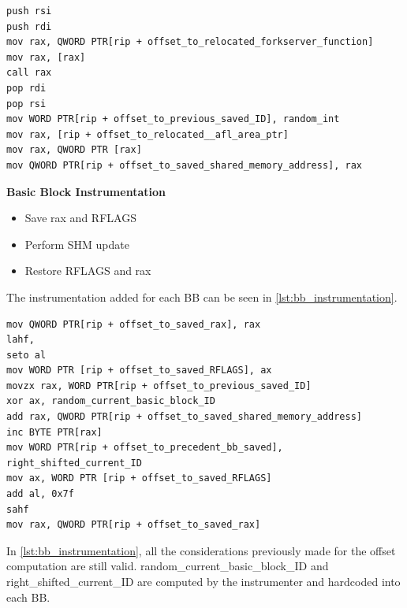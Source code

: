 \begin{lstlisting}[caption={Initial Instrumentation},label=lst:init_instr]
push rsi
push rdi
mov rax, QWORD PTR[rip + offset_to_relocated_forkserver_function]
mov rax, [rax]
call rax
pop rdi
pop rsi
mov WORD PTR[rip + offset_to_previous_saved_ID], random_int
mov rax, [rip + offset_to_relocated__afl_area_ptr]
mov rax, QWORD PTR [rax]
mov QWORD PTR[rip + offset_to_saved_shared_memory_address], rax
\end{lstlisting}

\begin{center}
\textbf{Basic Block Instrumentation}    
\end{center}
\begin{itemize}
    \item Save rax and RFLAGS
    \item Perform \gls{SHM} update 
    \item Restore RFLAGS and rax
\end{itemize}
The instrumentation added for each \gls{BB} can be seen in \cref{lst:bb_instrumentation}.

\begin{lstlisting}[caption={Basic Block Instrumentation},label=lst:bb_instrumentation]
mov QWORD PTR[rip + offset_to_saved_rax], rax
lahf,
seto al
mov WORD PTR [rip + offset_to_saved_RFLAGS], ax
movzx rax, WORD PTR[rip + offset_to_previous_saved_ID]        
xor ax, random_current_basic_block_ID
add rax, QWORD PTR[rip + offset_to_saved_shared_memory_address]
inc BYTE PTR[rax]
mov WORD PTR[rip + offset_to_precedent_bb_saved], right_shifted_current_ID
mov ax, WORD PTR [rip + offset_to_saved_RFLAGS]
add al, 0x7f
sahf
mov rax, QWORD PTR[rip + offset_to_saved_rax]
\end{lstlisting}

In \cref{lst:bb_instrumentation}, all the considerations previously made for the offset computation are still valid.
random\_current\_basic\_block\_ID and right\_shifted\_current\_ID are computed by the instrumenter and hardcoded into each \gls{BB}.

